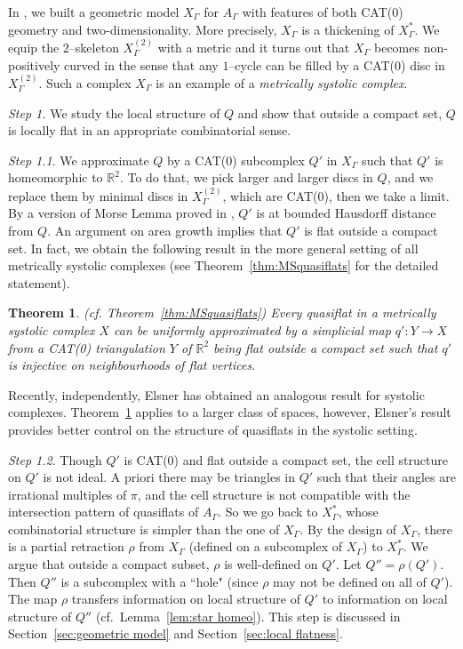 \documentclass[11pt]{amsart}
\newtheorem{theorem}{Theorem}[section]
\theoremstyle{definition}
\newcommand{\Xa}{X^{\ast}}
\newcommand{\sk}[2]{#1^{(#2)}}
\begin{document}
In \cite{Artinmetric}, we built a geometric model $X_\Gamma$ for $A_\Gamma$ with features of both CAT(0) geometry and two-dimensionality. More precisely, $X_\Gamma$ is a thickening of $\Xa_\Gamma$. We equip the $2$--skeleton $\sk{X_\Gamma}{2}$ with a metric and it turns out that $X_\Gamma$ becomes non-positively curved in the sense that any $1$--cycle can be filled by a CAT(0) disc in $\sk{X_\Gamma}{2}$.
Such a complex $X_\Gamma$ is an example of a \emph{metrically systolic complex}. 

\medskip

\noindent
\emph{Step 1.} We study the local structure of $Q$ and show that outside a compact set, $Q$ is locally flat in an appropriate combinatorial sense.


\medskip

\noindent
\emph{Step 1.1}. We approximate $Q$ by a CAT(0) subcomplex $Q'$ in $X_\Gamma$ such that $Q'$ is homeomorphic to $\mathbb R^2$. To do that, we pick larger and larger discs in $Q$, and we replace them by minimal discs in $\sk{X_\Gamma}{2}$, which are CAT(0), then we take a limit. By a version of Morse Lemma proved in \cite{Artinmetric}, $Q'$ is at bounded Hausdorff distance from $Q$. An argument on area growth implies that $Q'$ is flat outside a compact set. 
In fact, we obtain the following result in the more general setting of all metrically systolic complexes (see Theorem~\ref{thm:MSquasiflats} for the detailed statement). 
\begin{theorem}(cf. Theorem~\ref{thm:MSquasiflats})
	\label{thm:intro6}
	Every quasiflat in a metrically systolic complex $X$ can be uniformly approximated by a simplicial map $q'\colon Y \to X$ from a CAT(0) triangulation $Y$ of $\mathbb R^2$ being flat outside a compact set such that $q'$ is injective on neighbourhoods of flat vertices.
\end{theorem}
Recently, independently, Elsner \cite{elsner2017} has obtained an analogous result for systolic complexes. Theorem~\ref{thm:intro6} applies to a larger class of spaces, however, Elsner's result provides better control on the structure of quasiflats in the systolic setting.
\medskip

\noindent
\emph{Step 1.2}. Though $Q'$ is CAT(0) and flat outside a compact set, the cell structure on $Q'$ is not ideal. A priori there may be triangles in $Q'$ such that their angles are irrational multiples of $\pi$, and the cell structure is not compatible with the intersection pattern of quasiflats of $A_\Gamma$. So we go back to $\Xa_\Gamma$, whose combinatorial structure is simpler than the one of $X_\Gamma$. By the design of $X_\Gamma$, there is 
a partial retraction $\rho$ from $X_\Gamma$ (defined on a subcomplex of $X_\Gamma$) to $\Xa_\Gamma$. We argue that outside a compact subset, $\rho$ is well-defined on $Q'$. Let $Q''=\rho(Q')$. Then $Q''$ is a subcomplex with a ``hole" (since $\rho$ may not be defined on all of $Q'$). The map $\rho$ transfers information on local structure of $Q'$ to information on local structure of $Q''$ (cf.\ Lemma~\ref{lem:star homeo}). This step is discussed in Section~\ref{sec:geometric model} and Section~\ref{sec:local flatness}.
\medskip
\end{document}
